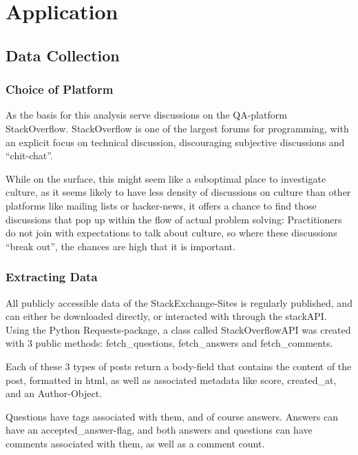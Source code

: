 \section{Application }

\subsection{Data Collection}

\subsubsection{Choice of Platform}

As the basis for this analysis serve discussions on the QA-platform StackOverflow. StackOverflow is one of the largest
forums for programming, with an explicit focus on technical discussion, discouraging subjective discussions and
“chit-chat”.\cite{stack_overflow_faq}

While on the surface, this might seem like a suboptimal place to investigate culture, as it seems likely to have less
density of discussions on culture than other platforms like mailing lists or hacker-news, it offers a chance to find
those discussions that pop up within the flow of actual problem solving: Practitioners do not join with expectations
to talk about culture, so where these discussions “break out”, the chances are high that it is important.

\subsubsection{Extracting Data}

All publicly accessible data of the StackExchange-Sites is regularly published, and can either be downloaded directly,
or interacted with through the stackAPI. Using the Python Requests-package, a class called StackOverflowAPI was created
with 3 public methods: fetch\_questions, fetch\_answers and fetch\_comments.

Each of these 3 types of posts return a body-field that contains the content of the post, formatted in html, as well
as associated metadata like score, created\_at, and an Author-Object.

Questions have tags associated with them, and of course answers. Answers can have an accepted\_answer-flag, and both
answers and questions can have comments associated with them, as well as a comment count.

